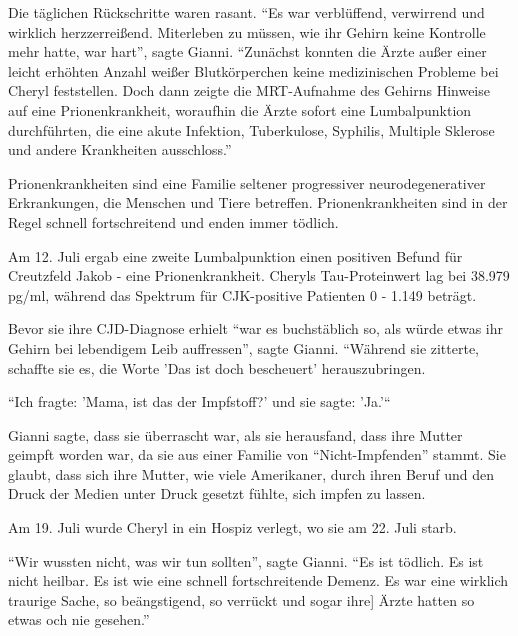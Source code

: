 Die täglichen Rückschritte waren rasant. ``Es war verblüffend, verwirrend und
wirklich herzzerreißend. Miterleben zu müssen, wie ihr Gehirn keine Kontrolle
mehr hatte, war hart'', sagte Gianni. ``Zunächst konnten die Ärzte außer einer
leicht erhöhten Anzahl weißer Blutkörperchen keine medizinischen Probleme bei
Cheryl feststellen. Doch dann zeigte die MRT-Aufnahme des Gehirns Hinweise auf
eine Prionenkrankheit, woraufhin die Ärzte sofort eine Lumbalpunktion
durchführten, die eine akute Infektion, Tuberkulose, Syphilis, Multiple Sklerose
und andere Krankheiten ausschloss.''

Prionenkrankheiten sind eine Familie seltener progressiver neurodegenerativer
Erkrankungen, die Menschen und Tiere betreffen. Prionenkrankheiten sind in der
Regel schnell fortschreitend und enden immer tödlich.

Am 12. Juli ergab eine zweite Lumbalpunktion einen positiven Befund für
Creutzfeld Jakob - eine Prionenkrankheit. Cheryls Tau-Proteinwert lag bei 38.979
pg/ml, während das Spektrum für CJK-positive Patienten 0 - 1.149 beträgt.

Bevor sie ihre CJD-Diagnose erhielt ``war es buchstäblich so, als würde etwas
ihr Gehirn bei lebendigem Leib auffressen'', sagte Gianni. ``Während sie
zitterte, schaffte sie es, die Worte 'Das ist doch bescheuert' herauszubringen.

``Ich fragte: 'Mama, ist das der Impfstoff?' und sie sagte: 'Ja.'``

Gianni sagte, dass sie überrascht war, als sie herausfand, dass ihre Mutter
geimpft worden war, da sie aus einer Familie von ``Nicht-Impfenden'' stammt. Sie
glaubt, dass sich ihre Mutter, wie viele Amerikaner, durch ihren Beruf und den
Druck der Medien unter Druck gesetzt fühlte, sich impfen zu lassen.

Am 19. Juli wurde Cheryl in ein Hospiz verlegt, wo sie am 22. Juli starb.

``Wir wussten nicht, was wir tun sollten'', sagte Gianni. ``Es ist tödlich. Es
ist nicht heilbar. Es ist wie eine schnell fortschreitende Demenz. Es war eine
wirklich traurige Sache, so beängstigend, so verrückt und sogar ihre] Ärzte
  hatten so etwas och nie gesehen.''
